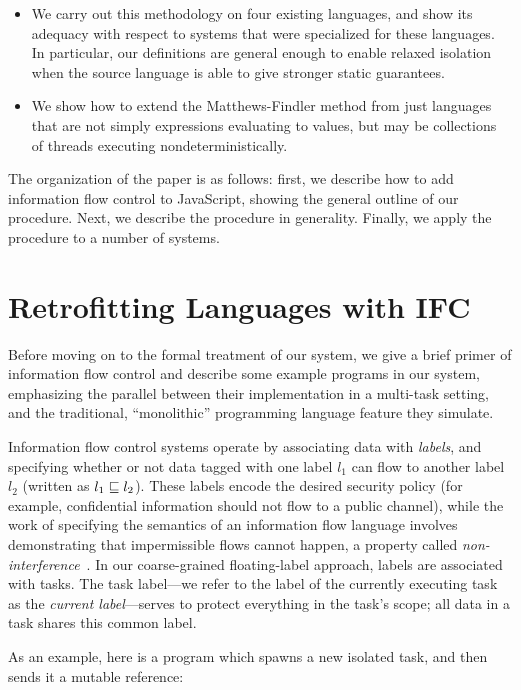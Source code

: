 \documentclass{llncs}
\begin{document}
{\begin{itemize}
    \item We carry out this methodology on four existing languages, and
        show its adequacy with respect to systems that were specialized
        for these languages.  In particular, our definitions are general
        enough to enable relaxed isolation when the source language is
        able to give stronger static guarantees.

    \item We show how to extend the Matthews-Findler method from just
        languages that are not simply expressions evaluating to values,
        but may be collections of threads executing nondeterministically.
\end{itemize}

The organization of the paper is as follows: first, we describe how to
add information flow control to JavaScript, showing the general outline of
our procedure. Next, we describe the procedure in generality.  Finally, we
apply the procedure to a number of systems.
}
\section{Retrofitting Languages with IFC}
\label{sec:retrofit}

Before moving on to the formal treatment of our system, we give
a brief primer of information flow control and describe some example programs
in our system, emphasizing the parallel between their implementation
in a multi-task setting, and the traditional, ``monolithic'' programming
language feature they simulate.

Information flow control systems operate by associating data with \emph{labels},
and specifying whether or not data tagged with one label \ensuremath{l_{1}} can flow
to another
label \ensuremath{l_{2}} (written as \ensuremath{l_{1}\flows{}l_{2}}).  These labels encode the desired
security policy (for example, confidential information should not flow to
a public channel), while the work of specifying the semantics of an information
flow language involves demonstrating that impermissible flows cannot happen,
a property called \emph{non-interference}~\cite{Goguen82}.
In our coarse-grained floating-label approach, labels are associated with tasks.
The task label---we refer to the label of the currently executing task as the
\emph{current label}---serves to protect everything in the task's scope;
all data in a task shares this common label.

As an example, here is a program which spawns a new isolated task,
and then sends it a mutable reference:
\end{document}
